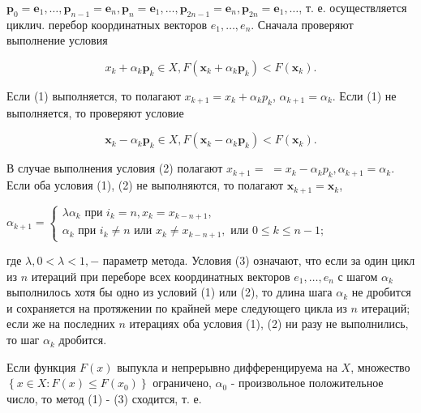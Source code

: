 \documentclass[10pt]{article}
\begin{document}
$\boldsymbol{p}_{0}=\boldsymbol{e}_{1}, \ldots, \boldsymbol{p}_{n-1}=\boldsymbol{e}_{n}, \boldsymbol{p}_{n}=\boldsymbol{e}_{1}, \ldots, \boldsymbol{p}_{2 n-1}=\boldsymbol{e}_{n}, \boldsymbol{p}_{2 n}=\boldsymbol{e}_{1}, \ldots$, т. е. осуществляется циклич. перебор координатных векторов $e_{1}, \ldots, e_{n}$. Сначала проверяют выполнение условия



\[

x_{k}+\alpha_{k} \boldsymbol{p}_{k} \in X, F\left(\boldsymbol{x}_{k}+\alpha_{k} \boldsymbol{p}_{k}\right)<F\left(\boldsymbol{x}_{k}\right) .

\]



Если (1) выполняется, то полагают $x_{k+1}=x_{k}+\alpha_{k} p_{k}$, $\alpha_{k+1}=\alpha_{k}$. Если (1) не выполняется, то проверяют условие



\[

\boldsymbol{x}_{k}-\alpha_{k} \boldsymbol{p}_{k} \in X, F\left(\boldsymbol{x}_{k}-\alpha_{k} \boldsymbol{p}_{k}\right)<F\left(\boldsymbol{x}_{k}\right) .

\]



В случае выполнения условия (2) полагают $x_{k+1}=$ $=x_{k}-\alpha_{k} p_{k}, \alpha_{k+1}=\alpha_{k}$. Если оба условия (1), (2) не выполняются, то полагают $\boldsymbol{x}_{k+1}=\boldsymbol{x}_{k}$,



$\alpha_{k+1}=\left\{\begin{array}{l}\lambda \alpha_{k} \text { при } i_{k}=n, x_{k}=x_{k-n+1}, \\ \alpha_{k} \text { при } i_{k} \neq n \text { или } x_{k} \neq x_{k-n+1}, \text { или } 0 \leqslant k \leqslant n-1 ;\end{array}\right.$



где $\lambda, 0<\lambda<1,-$ параметр метода. Условия (3) означают, что если за один цикл из $n$ итераций при переборе всех координатных векторов $e_{1}, \ldots, e_{n}$ с шагом $\alpha_{k}$ выполнилось хотя бы одно из условий (1) или (2), то длина шага $\alpha_{k}$ не дробится и сохраняется на протяжении по крайней мере следующего цикла из $n$ итераций; если же на последних $n$ итерациях оба условия (1), (2) ни разу не выполнились, то шаг $\alpha_{k}$ дробится.



Если функция $F(x)$ выпукла и непрерывно дифференцируема на $X$, множество $\left\{x \in X: F(x) \leqslant F\left(x_{0}\right)\right\}$ ограничено, $\alpha_{0}$ - произвольное положительное число, то метод (1) - (3) сходится, т. е.
\end{document}
